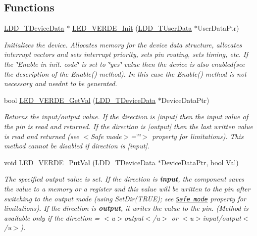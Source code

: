 \subsection*{Functions}
\begin{DoxyCompactItemize}
\item 
\hyperlink{group___p_e___types__module_gac5cf1362f1f0e3a2ce71b1bf2276d091}{L\+D\+D\+\_\+\+T\+Device\+Data} $\ast$ \hyperlink{group___l_e_d___v_e_r_d_e__module_ga6e76b61ceb99f72271e97f7978ac3b6c}{L\+E\+D\+\_\+\+V\+E\+R\+D\+E\+\_\+\+Init} (\hyperlink{group___p_e___types__module_ga0b66a73f87238a782318aa0be7578e35}{L\+D\+D\+\_\+\+T\+User\+Data} $\ast$User\+Data\+Ptr)
\begin{DoxyCompactList}\small\item\em Initializes the device. Allocates memory for the device data structure, allocates interrupt vectors and sets interrupt priority, sets pin routing, sets timing, etc. If the \char`\"{}\+Enable
    in init. code\char`\"{} is set to \char`\"{}yes\char`\"{} value then the device is also enabled(see the description of the Enable() method). In this case the Enable() method is not necessary and needn\textquotesingle{}t to be generated. \end{DoxyCompactList}\item 
bool \hyperlink{group___l_e_d___v_e_r_d_e__module_gae737455cf5902b6e5f79b47aecececea}{L\+E\+D\+\_\+\+V\+E\+R\+D\+E\+\_\+\+Get\+Val} (\hyperlink{group___p_e___types__module_gac5cf1362f1f0e3a2ce71b1bf2276d091}{L\+D\+D\+\_\+\+T\+Device\+Data} $\ast$Device\+Data\+Ptr)
\begin{DoxyCompactList}\small\item\em Returns the input/output value. If the direction is \mbox{[}input\mbox{]} then the input value of the pin is read and returned. If the direction is \mbox{[}output\mbox{]} then the last written value is read and returned (see $<$\+Safe mode$>$=\char`\"{}\char`\"{}$>$ property for limitations). This method cannot be disabled if direction is \mbox{[}input\mbox{]}. \end{DoxyCompactList}\item 
void \hyperlink{group___l_e_d___v_e_r_d_e__module_ga9e0b060297ed839406b447f52ba1b68f}{L\+E\+D\+\_\+\+V\+E\+R\+D\+E\+\_\+\+Put\+Val} (\hyperlink{group___p_e___types__module_gac5cf1362f1f0e3a2ce71b1bf2276d091}{L\+D\+D\+\_\+\+T\+Device\+Data} $\ast$Device\+Data\+Ptr, bool Val)
\begin{DoxyCompactList}\small\item\em The specified output value is set. If the direction is {\bfseries  input}, the component saves the value to a memory or a register and this value will be written to the pin after switching to the output mode (using {\ttfamily Set\+Dir(\+T\+R\+U\+E)}; see \href{BitIOProperties.html#SafeMode}{\tt Safe mode} property for limitations). If the direction is {\bfseries output}, it writes the value to the pin. (Method is available only if the direction = $<$u$>${\ttfamily output}$<$/u$>$ or $<$u$>${\ttfamily  input/output}$<$/u$>$). \end{DoxyCompactList}\item 

\end{DoxyCompactItemize}
